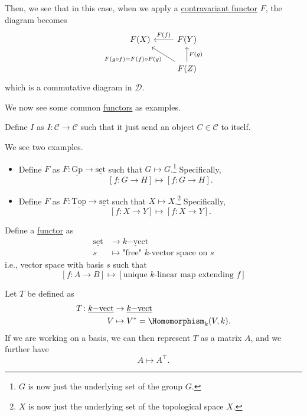 \begin{eg}
	Then, we see that in this case, when we apply a \hyperref[def:contravariant-functor]{contravariant functor} \(F\), the diagram becomes
	\[
		\begin{tikzcd}
			F(X)  & F(Y)\ar[l, "F(f)"']\\
			& F(Z)\ar[lu, "F(g\circ f)=F(f)\circ F(g)"]\ar[u, "F(g)"']
		\end{tikzcd}
	\]
	which is a commutative diagram in \(\mathscr{D}\).
\end{eg}

We now see some common \hyperref[def:functor]{functors} as examples.
\begin{eg}
	Define \(I\) as \(I\colon \mathscr{C} \to \mathscr{C}\) such that it just send an object \(C\in \mathscr{C}\) to itself.
\end{eg}
\begin{eg}\label{eg:forgetful-functor}
	We see two examples.
	\begin{itemize}
		\item Define \(F\) as \(F\colon \underline{\mathrm{Gp}}\to \underline{\mathrm{set}}\) such that \(G\mapsto G\).\footnote{\(G\) is now just the underlying set of the group \(G\).}
		      Specifically,
		      \[
			      \left[f\colon G\to H\right]\mapsto \left[f\colon G\to H\right].
		      \]
		\item Define \(F\) as \(F\colon \underline{\mathrm{Top}}\to \underline{\mathrm{set}}\) such that \(X\mapsto X\).\footnote{\(X\) is now just the underlying set of the topological space \(X\).}
		      Specifically,
		      \[
			      \left[f\colon X\to Y\right]\mapsto \left[f\colon X\to Y\right].
		      \]
	\end{itemize}
\end{eg}
\begin{eg}\label{eg:free-functor}
	Define a \hyperref[def:functor]{functor} as
	\[
		\begin{split}
			\underline{\mathrm{set}}&\to \underline{k\mathrm{-vect}}  \\
			s&\mapsto \text{"free" \(k\)-vector space on \(s\)}
		\end{split}
	\]
	i.e., vector space with basis \(s\) such that
	\[
		\left[f\colon A\to B\right]\mapsto \left[\text{unique \(k\)-linear map extending \(f\)}\right]
	\]
\end{eg}
\begin{eg}
	Let \(T\) be defined as
	\[
		\begin{split}
			T\colon \underline{k\mathrm{-vect}}&\to \underline{k\mathrm{-vect}}  \\
			V&\mapsto V^{\ast} = \Homomorphism _k(V, k).
		\end{split}
	\]
	If we are working on a basis, we can then represent \(T\) as a matrix \(A\), and we further have
	\[
		A\mapsto A^{\top}.
	\]
\end{eg}

